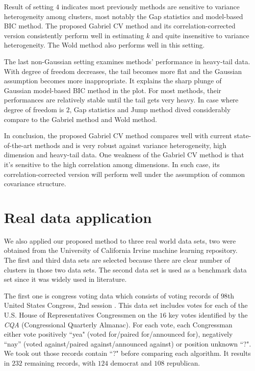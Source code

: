 \documentclass[12pt]{article}
\begin{document}
Result of setting $4$ indicates most previously methods are sensitive to variance heterogeneity among 
clusters, most notably the Gap statistics and model-based BIC method. The proposed Gabriel CV method
and its correlation-corrected version consistently perform well in estimating $k$ and quite insensitive
to variance heterogeneity. The Wold method also performs well in this setting.   

The last non-Gaussian setting examines methods' performance in heavy-tail data. With degree of freedom 
decreases, the tail becomes more flat and the Gaussian assumption becomes more inappropriate. It explains
the sharp plunge of Gaussian model-based BIC method in the plot. For most methods, their performances are 
relatively stable until the tail gets very heavy. In case where degree of freedom is $2$, Gap statistics 
and Jump method dived considerably compare to the Gabriel method and Wold method. 

In conclusion, the proposed Gabriel CV method compares well with current state-of-the-art methods and 
is very robust against variance heterogeneity, high dimension and heavy-tail data. One weakness of the 
Gabriel CV method is that it's sensitive to the high correlation among dimensions. In such case, its 
correlation-corrected version will perform well under the assumption of common covariance structure. 

\section{Real data application}
We also applied our proposed method to three real world data sets, two were obtained
from the University of California Irvine machine learning repository. The
first and third data sets are selected because there are clear number of
clusters in those two data sets. The second data set is used as a benchmark
data set since it was widely used in literature.

The first one is congress voting data which consists of voting records of
$98$th United States Congress, $2$nd session \citep{schlimmer1987concept}. 
This data set includes votes for each of the U.S. House of Representatives Congressmen on the $16$ key votes
identified by the \textit{CQA} (Congressional Quarterly Almanac). For each
vote, each Congressman either vote positively ``yea" (voted for/paired
for/announced for),  negatively ``nay'' (voted against/paired
against/announced against) or position unknown ``?". We took out those records
contain ``?" before comparing each algorithm. It results in $232$ remaining
records, with $124$ democrat and $108$ republican. 
\end{document}
